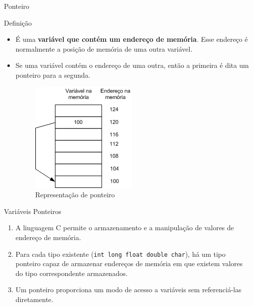 \begin{frame}[plain]{Ponteiro}
  \begin{block}{Definição}
     \begin{itemize}[<+->]
        \item É uma \textbf{variável que contém um endereço de memória}. Esse endereço é normalmente a posição de memória de
         uma outra variável.
        \item Se uma variável contém o endereço de uma outra, então a primeira é dita um ponteiro para a segunda.
        \begin{figure}[!htpb]
          \centering
          \includegraphics[width=.3\textwidth]{figs/fig_ponteiros/exemplo-representacao-ponteiro}  
           \caption{Representação de ponteiro}    
        \end{figure}
      \end{itemize}
  \end{block}  
\end{frame}

\begin{frame}[c]{Variáveis Ponteiros}
  \begin{enumerate}[<+->]
  \item A linguagem C permite o armazenamento e a manipulação de valores de endereço de memória.
  \item Para cada tipo existente (\texttt{int  long float double  char}), há um tipo ponteiro capaz de armazenar endereços de memória em que existem valores do tipo correspondente armazenados.
  \item Um ponteiro proporciona um modo de acesso a variáveis sem referenciá-las diretamente. 
  \end{enumerate} 
\end{frame}

